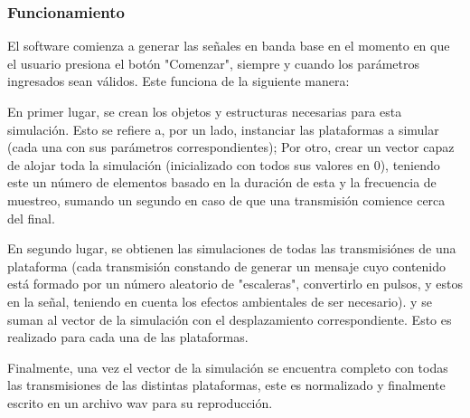 \documentclass[a4paper,10pt]{article}
\begin{document}
\subsubsection{Funcionamiento}
El software comienza a generar las señales en banda base en el momento en que el usuario presiona el botón "Comenzar", siempre y cuando los parámetros ingresados sean válidos. Este funciona de la siguiente manera:
\par
En primer lugar, se crean los objetos y estructuras necesarias para esta simulación. Esto se refiere a, por un lado, instanciar las plataformas a simular (cada una con sus parámetros correspondientes);  Por otro, crear un vector capaz de alojar toda la simulación (inicializado con todos sus valores en 0), teniendo este un número de elementos basado en la duración de esta y la frecuencia de muestreo, sumando un segundo en caso de que una transmisión comience cerca del final.
\par
En segundo lugar, se obtienen las simulaciones de todas las transmisiónes de una plataforma (cada transmisión constando de generar un mensaje cuyo contenido está formado por un número aleatorio de "escaleras", convertirlo en pulsos, y estos en la señal, teniendo en cuenta los efectos ambientales de ser necesario). y se suman al vector de la simulación con el desplazamiento correspondiente. Esto es realizado para cada una de las plataformas.
\par
Finalmente, una vez el vector de la simulación se encuentra completo con todas las transmisiones de las distintas plataformas, este es normalizado y finalmente escrito en un archivo wav  para su reproducción.
\end{document}
